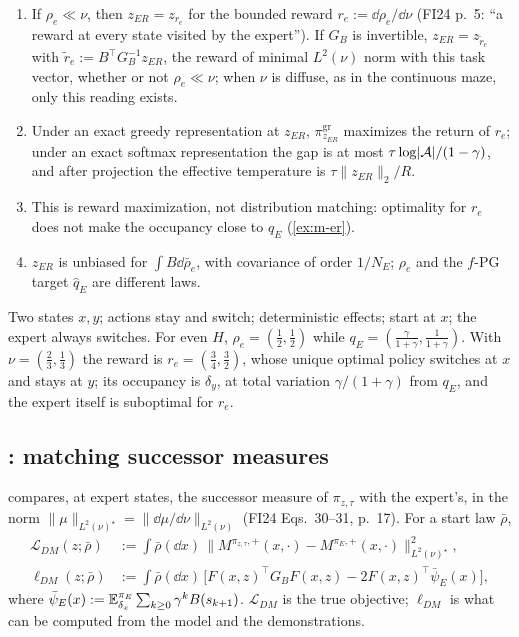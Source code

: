 \begin{proposition}\label{prop:m-er}
\begin{enumerate}[nosep,label=(\alph*)]
\item If $\rho_e\ll\nu$, then $z_{ER}=z_{r_e}$ for the bounded reward $r_e:=\dd\rho_e/\dd\nu$ (FI24 p.~5: ``a reward at every state visited by the expert''). If $G_B$ is invertible, $z_{ER}=z_{\tilde r_e}$ with $\tilde r_e:=B^\top G_B^{-1}z_{ER}$, the reward of minimal $L^2(\nu)$ norm with this task vector, whether or not $\rho_e\ll\nu$; when $\nu$ is diffuse, as in the continuous maze, only this reading exists.
\item Under an exact greedy representation at $z_{ER}$, $\pi^{\mathrm{gr}}_{z_{ER}}$ maximizes the return of $r_e$; under an exact softmax representation the gap is at most $\tau\log\lvert\mathcal{A}\rvert/(1-\gamma)$, and after projection the effective temperature is $\tau\lVert z_{ER}\rVert_2/R$.
\item This is reward maximization, not distribution matching: optimality for $r_e$ does not make the occupancy close to $q_E$ (\cref{ex:m-er}).
\item $z_{ER}$ is unbiased for $\int B\dd\bar\rho_e$, with covariance of order $1/N_E$; $\rho_e$ and the $f$-PG target $\hat q_E$ are different laws.
\end{enumerate}
\end{proposition}

\begin{example}\label{ex:m-er}
Two states $x,y$; actions stay and switch; deterministic effects; start at $x$; the expert always switches. For even $H$, $\rho_e=(\frac12,\frac12)$ while $q_E=(\frac\gamma{1+\gamma},\frac1{1+\gamma})$. With $\nu=(\frac23,\frac13)$ the reward is $r_e=(\frac34,\frac32)$, whose unique optimal policy switches at $x$ and stays at $y$; its occupancy is $\delta_y$, at total variation $\gamma/(1+\gamma)$ from $q_E$, and the expert itself is suboptimal for $r_e$.
\end{example}

\subsection{\texorpdfstring{\DMFB}{DM-FB}: matching successor measures}

\DMFB{} compares, at expert states, the successor measure of $\pi_{z,\tau}$ with the expert's, in the norm $\lVert\mu\rVert_{L^2(\nu)^\star}=\lVert\dd\mu/\dd\nu\rVert_{L^2(\nu)}$ (FI24 Eqs.~30--31, p.~17). For a start law $\bar\rho$,
\begin{align}
\mathcal L_{DM}(z;\bar\rho)&:=\int\bar\rho(\dd x)\,\big\lVert M^{\pi_{z,\tau},+}(x,\cdot)-M^{\pi_E,+}(x,\cdot)\big\rVert^2_{L^2(\nu)^\star},\label{eq:m-LDM}\\
\ell_{DM}(z;\bar\rho)&:=\int\bar\rho(\dd x)\,\big[F(x,z)^\top G_BF(x,z)-2F(x,z)^\top\bar\psi_E(x)\big],\label{eq:m-lDM}
\end{align}
where $\bar\psi_E(x):=\mathbb{E}^{\pi_E}_{\delta_x}\sum_{k\ge0}\gamma^kB(s_{k+1})$.
$\mathcal L_{DM}$ is the true objective; $\ell_{DM}$ is what can be computed from the model and the demonstrations.

